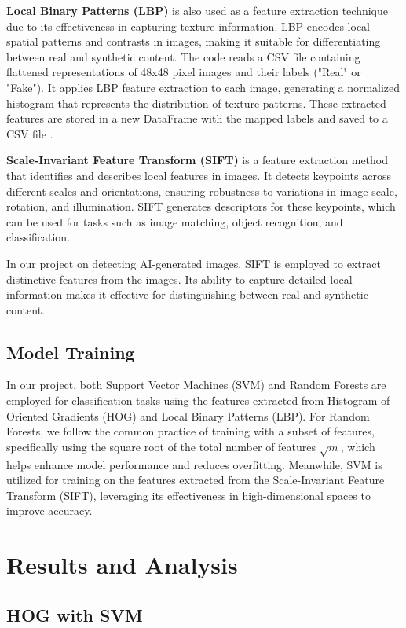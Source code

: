 \documentclass[10pt,twocolumn,letterpaper]{article}
\begin{document}
\textbf{Local Binary Patterns (LBP)} is also used as a feature extraction technique due to its effectiveness in capturing texture information. LBP encodes local spatial patterns and contrasts in images, making it suitable for differentiating between real and synthetic content. The code reads a CSV file containing flattened representations of 48x48 pixel images and their labels ("Real" or "Fake"). It applies LBP feature extraction to each image, generating a normalized histogram that represents the distribution of texture patterns. These extracted features are stored in a new DataFrame with the mapped labels and saved to a CSV file .

\textbf{Scale-Invariant Feature Transform (SIFT)} is a feature extraction method that identifies and describes local features in images. It detects keypoints across different scales and orientations, ensuring robustness to variations in image scale, rotation, and illumination. SIFT generates descriptors for these keypoints, which can be used for tasks such as image matching, object recognition, and classification.

In our project on detecting AI-generated images, SIFT is employed to extract distinctive features from the images. Its ability to capture detailed local information makes it effective for distinguishing between real and synthetic content.
\subsection{Model Training}
In our project, both Support Vector Machines (SVM) and Random Forests are employed for classification tasks using the features extracted from Histogram of Oriented Gradients (HOG) and Local Binary Patterns (LBP). For Random Forests, we follow the common practice of training with a subset of features, specifically using the square root of the total number of features \( \sqrt{m} \), which helps enhance model performance and reduces overfitting. Meanwhile, SVM is utilized for training on the features extracted from the Scale-Invariant Feature Transform (SIFT), leveraging its effectiveness in high-dimensional spaces to improve accuracy.

\section{Results and Analysis}
\subsection{HOG with SVM}
\end{document}
